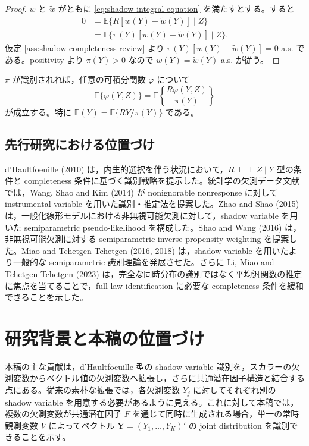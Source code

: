 \documentclass[dvipdfmx,autodetect-engine]{jsarticle}
\newcommand{\indep}{\mathrel{\perp\!\!\!\perp}}
\newcommand{\E}{\mathbb{E}}
\newcommand{\1}{\mathbf{1}}
\newcommand{\Y}{\bm{Y}}
\begin{document}
\begin{proof}
$w$ と $\widetilde w$ がともに \eqref{eq:shadow-integral-equation} を満たすとする。すると
\begin{align}
0
&=\E\{R[w(Y)-\widetilde w(Y)]\mid Z\}\\
&=\E\{\pi(Y)[w(Y)-\widetilde w(Y)]\mid Z\}.
\end{align}
仮定 \ref{ass:shadow-completeness-review} より $\pi(Y)[w(Y)-\widetilde w(Y)]=0$ a.s. である。positivity より $\pi(Y)>0$ なので $w(Y)=\widetilde w(Y)$ a.s. が従う。
\end{proof}

$\pi$ が識別されれば，任意の可積分関数 $\varphi$ について
\begin{equation}
  \E\{\varphi(Y,Z)\}
  =\E\left\{\frac{R\varphi(Y,Z)}{\pi(Y)}\right\}
  \label{eq:shadow-ipw-functional}
\end{equation}
が成立する。特に $\E(Y)=\E\{RY/\pi(Y)\}$ である。

\subsection{先行研究における位置づけ}

d'Haultfoeuille (2010) は，内生的選択を伴う状況において，$R\indep Z\mid Y$ 型の条件と completeness 条件に基づく識別戦略を提示した。統計学の欠測データ文献では，Wang, Shao and Kim (2014) が nonignorable nonresponse に対して instrumental variable を用いた識別・推定法を提案した。Zhao and Shao (2015) は，一般化線形モデルにおける非無視可能欠測に対して，shadow variable を用いた semiparametric pseudo-likelihood を構成した。Shao and Wang (2016) は，非無視可能欠測に対する semiparametric inverse propensity weighting を提案した。Miao and Tchetgen Tchetgen (2016, 2018) は，shadow variable を用いたより一般的な semiparametric 識別理論を発展させた。さらに Li, Miao and Tchetgen Tchetgen (2023) は，完全な同時分布の識別ではなく平均汎関数の推定に焦点を当てることで，full-law identification に必要な completeness 条件を緩和できることを示した。

\section{研究背景と本稿の位置づけ}

本稿の主な貢献は，d'Haultfoeuille 型の shadow variable 識別を，スカラーの欠測変数からベクトル値の欠測変数へ拡張し，さらに共通潜在因子構造と結合する点にある。従来の素朴な拡張では，各欠測変数 $Y_j$ に対してそれぞれ別の shadow variable を用意する必要があるように見える。これに対して本稿では，複数の欠測変数が共通潜在因子 $F$ を通じて同時に生成される場合，単一の常時観測変数 $V$ によってベクトル $\Y=(Y_1,\ldots,Y_K)'$ の joint distribution を識別できることを示す。
\end{document}
